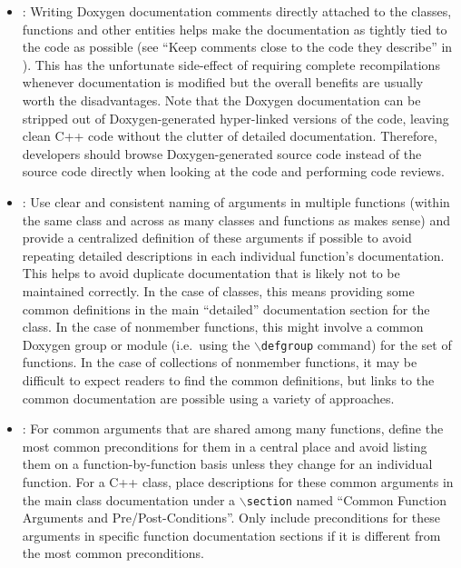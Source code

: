 \begin{itemize}


{}\item\DOXWriteInHeaders: Writing Doxygen documentation comments directly
attached to the classes, functions and other entities helps make the
documentation as tightly tied to the code as possible (see ``Keep comments
close to the code they describe'' in {}\cite[Section
32.5]{CodeComplete2nd04}).  This has the unfortunate side-effect of requiring
complete recompilations whenever documentation is modified but the overall
benefits are usually worth the disadvantages.  Note that the Doxygen
documentation can be stripped out of Doxygen-generated hyper-linked versions
of the code, leaving clean C++ code without the clutter of detailed
documentation.  Therefore, developers should browse Doxygen-generated source
code instead of the source code directly when looking at the code and
performing code reviews.


{}\item\DOXUseCentralizedDefintions: Use clear and consistent naming of
arguments in multiple functions (within the same class and across as many
classes and functions as makes sense) and provide a centralized definition of
these arguments if possible to avoid repeating detailed descriptions in each
individual function's documentation.  This helps to avoid duplicate
documentation that is likely not to be maintained correctly.  In the case of
classes, this means providing some common definitions in the main ``detailed''
documentation section for the class.  In the case of nonmember functions, this
might involve a common Doxygen group or module (i.e.\ using the
{}\texttt{$\backslash$defgroup} command) for the set of functions.  In the
case of collections of nonmember functions, it may be difficult to expect
readers to find the common definitions, but links to the common documentation
are possible using a variety of approaches.


{}\item\DOXUseCentralizedPrePostConditions: For common arguments that are
shared among many functions, define the most common preconditions for them in
a central place and avoid listing them on a function-by-function basis unless
they change for an individual function.  For a C++ class, place descriptions
for these common arguments in the main class documentation under a
{}\texttt{$\backslash$section} named ``Common Function Arguments and
Pre/Post-Conditions''.  Only include preconditions for these arguments in
specific function documentation sections if it is different from the most
common preconditions.



\end{itemize}
